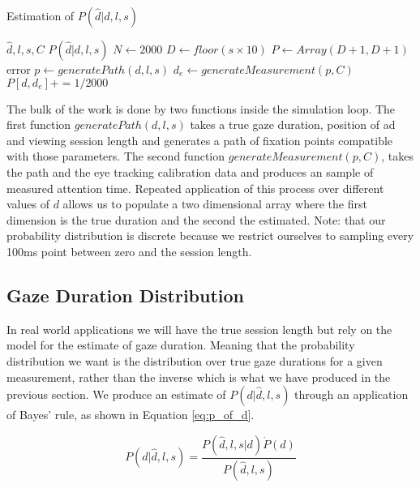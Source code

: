 \documentclass[12pt,a4paper]{article}
\numberwithin{equation}{section}
\begin{document}
\begin{algorithm}
\caption{Estimation of $P(\hat{d}|d,l,s)$}\label{alg:p_of_dhat}
\begin{algorithmic}
  \Require $\hat{d},l,s,C$
  \Ensure $P(\hat{d}|d,l,s)$
  \State $N \gets 2000$
  \State $D \gets floor(s \times 10)$ 
  \State $P \gets Array(D+1,D+1)$ 
    \State error
  \EndIf
   
     
      \State $p \gets generatePath(d,l,s)$
      \State $d_e \gets generateMeasurement(p,C)$  
      \State $P[d,d_e] += 1/2000$  
    \EndFor
  \EndFor
\end{algorithmic}
\end{algorithm}


The bulk of the work is done by two functions inside the simulation loop. The first function
$generatePath(d,l,s)$ takes a true gaze duration, position of ad and viewing session length and
generates a path of fixation points compatible with those parameters. The second function 
$generateMeasurement(p,C)$, takes the path and the eye tracking calibration data and produces
an sample of measured attention time. Repeated application of this process over different 
values of $d$ allows us to populate a two dimensional array where the first dimension is the
true duration and the second the estimated. Note: that our probability distribution is discrete
because we restrict ourselves to sampling every 100ms point between zero and the session length.

\subsection{Gaze Duration Distribution}

In real world applications we will have the true session length but rely on the model for the 
estimate of gaze duration. Meaning that the probability distribution we want is the distribution 
over true gaze durations for a given measurement, rather than the inverse which is what we 
have produced in the previous section. We produce an estimate of $P(d|\hat{d},l,s)$
through an application of Bayes' rule, as shown in Equation \ref{eq:p_of_d}.

\begin{equation}
\label{eq:p_of_d}
P(d|\hat{d},l,s) =  \frac{ P(\hat{d},l,s|d) \dot P(d) }{ P(\hat{d},l,s)  }
\end{equation}
\end{document}
